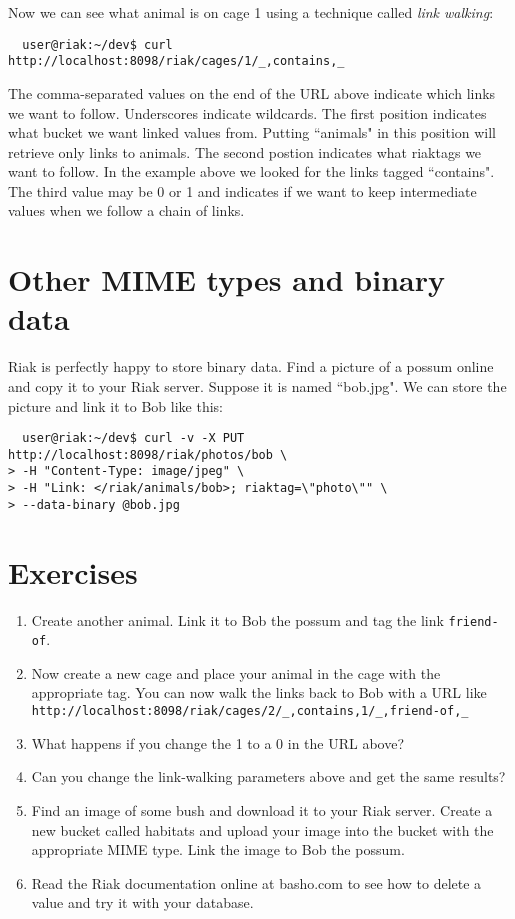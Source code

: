 \documentclass{article}
\begin{document}
Now we can see what animal is on cage 1 using a technique called \emph{link walking}:
\begin{verbatim}
  user@riak:~/dev$ curl http://localhost:8098/riak/cages/1/_,contains,_
\end{verbatim}
The comma-separated values on the end of the URL above indicate which links we want to follow.  Underscores indicate wildcards.  The first position indicates what bucket we want linked values from. Putting ``animals" in this position will retrieve only links to animals.  The second postion indicates what riaktags we want to follow.  In the example above we looked for the links tagged ``contains".  The third value may be 0 or 1 and indicates if we want to keep intermediate values when we follow a chain of links.

\section{Other MIME types and binary data}
Riak is perfectly happy to store binary data.  Find a picture of a possum online and copy it to your Riak server.  Suppose it is named ``bob.jpg".  We can store the picture and link it to Bob like this:

\begin{verbatim}
  user@riak:~/dev$ curl -v -X PUT http://localhost:8098/riak/photos/bob \
> -H "Content-Type: image/jpeg" \
> -H "Link: </riak/animals/bob>; riaktag=\"photo\"" \
> --data-binary @bob.jpg
\end{verbatim}

\section{Exercises}
\begin{enumerate}
  \item Create another animal.  Link it to Bob the possum and tag the link \texttt{friend-of}.
  \item Now create a new cage and place your animal in the cage with the appropriate tag.  You can now walk the links back to Bob with a URL like \\ \texttt{http://localhost:8098/riak/cages/2/\_,contains,1/\_,friend-of,\_}
  \item What happens if you change the 1 to a 0 in the URL above?
  \item Can you change the link-walking parameters above and get the same results?
  \item Find an image of some bush and download it to your Riak server.  Create a new bucket called habitats and upload your image into the bucket with the appropriate MIME type.  Link the image to Bob the possum.
      \item Read the Riak documentation online at basho.com to see how to delete a value and try it with your database.
\end{enumerate}






   
\end{document}
